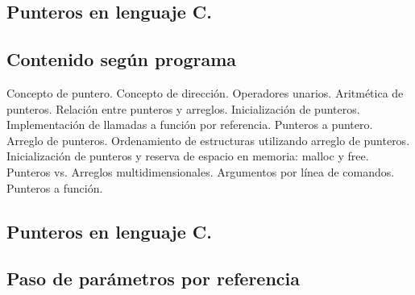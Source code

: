 \setcounter{subsection}{8}
\subsection*{Punteros en lenguaje C.}
\subsection*{Contenido según programa}
Concepto de puntero. Concepto de dirección. Operadores unarios.  Aritmética de punteros. Relación entre punteros y arreglos. Inicialización de punteros.  Implementación de llamadas a función por referencia. Punteros a puntero. Arreglo de punteros. Ordenamiento de estructuras utilizando arreglo de punteros. Inicialización de punteros y reserva de espacio en memoria: malloc y free. Punteros vs. Arreglos multidimensionales. Argumentos por línea de comandos. Punteros a función.

\setcounter{subsection}{8}
\subsection*{Punteros en lenguaje C.}

\subsection*{Paso de parámetros por referencia}


